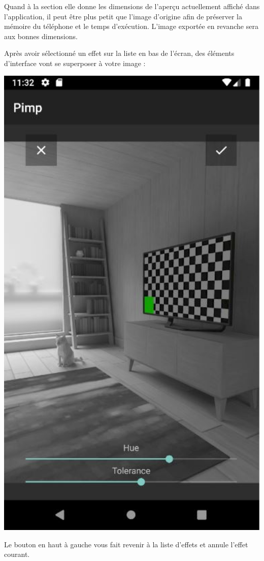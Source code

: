 \begin{center}
\begin{minipage}{.48\textwidth}
        Quand à la section {\faCog} elle donne les dimensions de l'aperçu actuellement affiché dans l'application, il peut être plus petit que l'image d'origine afin de préserver la mémoire du téléphone et le temps d'exécution. L'image exportée en revanche sera aux bonnes dimensions.
    \end{minipage}
\end{center}
\clearpage

Après avoir sélectionné un effet sur la liste en bas de l'écran, des éléments d'interface vont se superposer à votre image :
\begin{center}
    \begin{minipage}{.48\textwidth}
      \includegraphics[width=1\textwidth]{report_src/app_manual/effect_fragment_preview.JPG}
    \end{minipage}
    \begin{minipage}{.48\textwidth}
        Le bouton {\faRemove} en haut à gauche vous fait revenir à la liste d'effets et annule l'effet courant.
        \\


\end{minipage}
\end{center}
